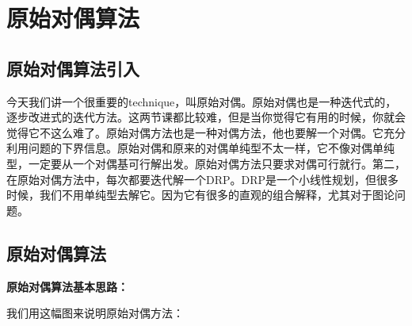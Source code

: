 \section{原始对偶算法}
\subsection{原始对偶算法引入}
今天我们讲一个很重要的technique，叫原始对偶。原始对偶也是一种迭代式的，逐步改进式的迭代方法。这两节课都比较难，但是当你觉得它有用的时候，你就会觉得它不这么难了。原始对偶方法也是一种对偶方法，他也要解一个对偶。它充分利用问题的下界信息。原始对偶和原来的对偶单纯型不太一样，它不像对偶单纯型，一定要从一个对偶基可行解出发。原始对偶方法只要求对偶可行就行。第二，在原始对偶方法中，每次都要迭代解一个DRP。DRP是一个小线性规划，但很多时候，我们不用单纯型去解它。因为它有很多的直观的组合解释，尤其对于图论问题。
\subsection{原始对偶算法}


\textbf{原始对偶算法基本思路：}

我们用这幅图来说明原始对偶方法：

